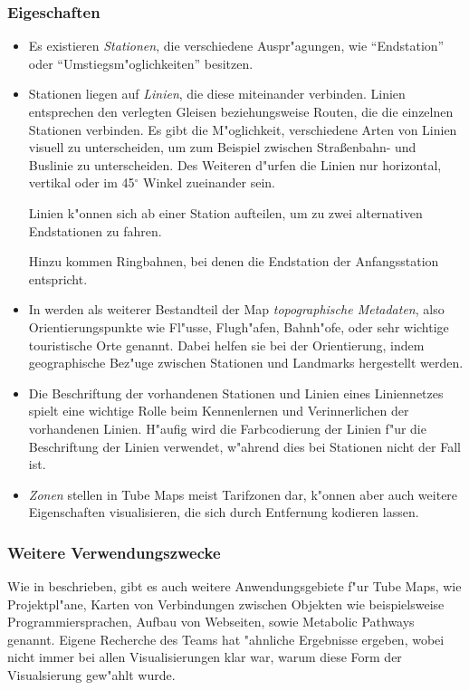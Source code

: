 \subsubsection{Eigeschaften}
\begin{itemize}
\item Es existieren \emph{Stationen}, die verschiedene Auspr"agungen, wie "`Endstation"' oder "`Umstiegsm"oglichkeiten"' besitzen. 

\item Stationen liegen auf \emph{Linien}, die diese miteinander verbinden. Linien entsprechen den verlegten Gleisen beziehungsweise Routen, die die einzelnen Stationen verbinden. Es gibt die M"oglichkeit, verschiedene Arten von Linien visuell zu unterscheiden, um zum Beispiel zwischen Stra\ss enbahn- und Buslinie zu unterscheiden. Des Weiteren d"urfen die Linien nur horizontal, vertikal oder im 45$^{\circ}$ Winkel zueinander sein. 

Linien k"onnen sich ab einer Station aufteilen, um zu zwei alternativen Endstationen zu fahren. 

Hinzu kommen Ringbahnen, bei denen die Endstation der Anfangsstation entspricht.

\item In \cite{automaticlayoutmetro08} werden als weiterer Bestandteil der Map \emph{topographische Metadaten}, also Orientierungspunkte wie Fl"usse, Flugh"afen, Bahnh"ofe, oder sehr wichtige touristische Orte genannt. Dabei helfen sie bei der Orientierung, indem geographische Bez"uge zwischen Stationen und Landmarks hergestellt werden.

\item Die Beschriftung der vorhandenen Stationen und Linien eines Liniennetzes spielt eine wichtige Rolle beim Kennenlernen und Verinnerlichen der vorhandenen Linien. H"aufig wird die Farbcodierung der Linien f"ur die Beschriftung der Linien verwendet, w"ahrend dies bei Stationen nicht der Fall ist. 

\item \emph{Zonen} stellen in Tube Maps meist Tarifzonen dar, k"onnen aber auch weitere Eigenschaften visualisieren, die sich durch Entfernung kodieren lassen. 
\end{itemize}

\subsubsection{Weitere Verwendungszwecke}
\label{tm:verwendungszwecke}
Wie in \cite{automaticlayoutmetro08} beschrieben, gibt es auch weitere Anwendungsgebiete f"ur Tube Maps, wie Projektpl"ane, Karten von Verbindungen zwischen Objekten wie beispielsweise Programmiersprachen, Aufbau von Webseiten, sowie Metabolic Pathways genannt. Eigene Recherche des Teams hat "ahnliche Ergebnisse ergeben, wobei nicht immer bei allen Visualisierungen klar war, warum diese Form der Visualsierung gew"ahlt wurde. 

